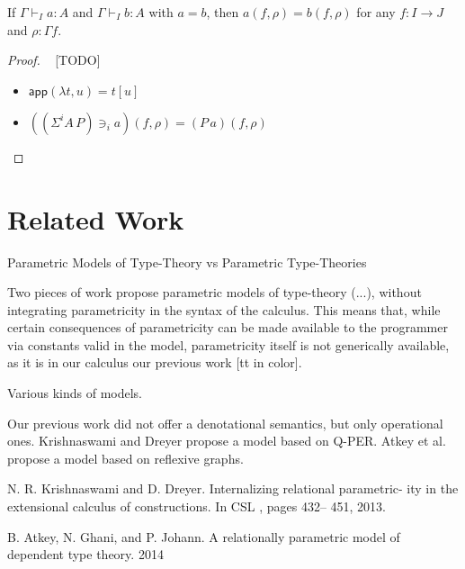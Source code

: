 \documentclass{PaperTools/latex/llncs}
\newcommand\op[1]{∋_{#1}}
\newcommand\ip[3]{Σ^{#1} {#2}\,{#3}}
\def\app#1#2{\mathsf{app}(#1,#2)}
\begin{document}
\begin{theorem}
  If $Γ ⊢_I a : A$ and $Γ ⊢_I b : A$ with $a = b$, then
  $a(f,ρ) = b(f,ρ)$ for any $f : I → J$ and $ρ : Γf$.
\end{theorem}
\begin{proof}~
  [TODO]
  \begin{itemize}
    \item $\app{λt}{u} = t[u]$
    \item $({(\ip i A P)} \op i a)(f,ρ) = (P\,a)(f,ρ)$
  \end{itemize}
\end{proof}


\section{Related Work}


Parametric Models of Type-Theory vs Parametric Type-Theories

Two pieces of work propose parametric models of type-theory (...), without
integrating parametricity in the syntax of the calculus. This means
that, while certain consequences of parametricity can be made
available to the programmer via constants valid in the model,
parametricity itself is not generically available, as it is in our
calculus our previous work [tt in color].


Various kinds of models.

Our previous work did not offer a denotational semantics, but only
operational ones.  Krishnaswami and Dreyer propose a model based on
Q-PER.  Atkey et al. propose a model based on reflexive graphs.



N. R. Krishnaswami and D. Dreyer. Internalizing relational parametric-
ity in the extensional calculus of constructions. In
CSL
, pages 432–
451, 2013.


B. Atkey, N. Ghani, and P. Johann. A relationally parametric model of
dependent type theory. 2014
\end{document}
